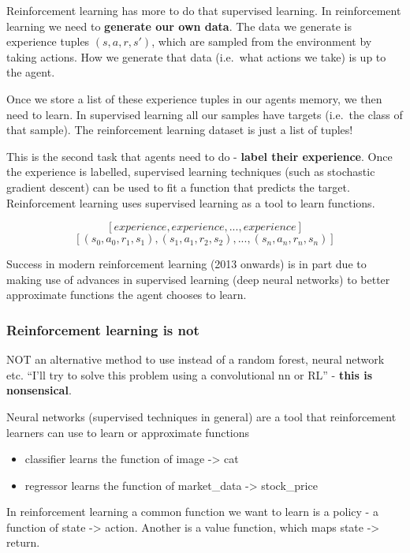 \documentclass[]{article}
\providecommand{\tightlist}{%
  \setlength{\itemsep}{0pt}\setlength{\parskip}{0pt}}
\begin{document}
Reinforcement learning has more to do that supervised learning. In
reinforcement learning we need to \textbf{generate our own data}. The
data we generate is experience tuples \((s,a,r,s')\), which are sampled
from the environment by taking actions. How we generate that data
(i.e.~what actions we take) is up to the agent.

Once we store a list of these experience tuples in our agents memory, we
then need to learn. In supervised learning all our samples have targets
(i.e.~the class of that sample). The reinforcement learning dataset is
just a list of tuples!

This is the second task that agents need to do - \textbf{label their
experience}. Once the experience is labelled, supervised learning
techniques (such as stochastic gradient descent) can be used to fit a
function that predicts the target. Reinforcement learning uses
supervised learning as a tool to learn functions.

\[[experience, experience, ..., experience]\]
\[[(s_0, a_0, r_1, s_1), (s_1, a_1, r_2, s_2), ..., (s_n, a_n, r_n, s_n)] \]

Success in modern reinforcement learning (2013 onwards) is in part due
to making use of advances in supervised learning (deep neural networks)
to better approximate functions the agent chooses to learn.

\hypertarget{reinforcement-learning-is-not}{%
\subsubsection{Reinforcement learning is
not}\label{reinforcement-learning-is-not}}

NOT an alternative method to use instead of a random forest, neural
network etc. ``I'll try to solve this problem using a convolutional nn
or RL'' - \textbf{this is nonsensical}.

Neural networks (supervised techniques in general) are a tool that
reinforcement learners can use to learn or approximate functions

\begin{itemize}
\tightlist
\item
  classifier learns the function of image -\textgreater{} cat
\item
  regressor learns the function of market\_data -\textgreater{}
  stock\_price
\end{itemize}

In reinforcement learning a common function we want to learn is a policy
- a function of state -\textgreater{} action. Another is a value
function, which maps state -\textgreater{} return.
\end{document}
